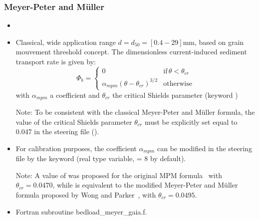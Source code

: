 \subsubsection{Meyer-Peter and M\"uller}
\begin{itemize}
\item {}
\item Classical, wide application range $d=d_{50} = [0.4-29]$mm, based on grain mouvement threshold concept. The dimensionless current-induced sediment transport rate is given by:
\begin{equation*}
\Phi_b=\left\{\begin{array}{ll}
0 & \text{if}\,\theta<\theta_{cr}\\
\alpha_{mpm}(\theta-\theta_{cr})^{3/2} & \text{otherwise}
\end{array}
\right.
\end{equation*}
with $\alpha_{mpm}$ a coefficient and $\theta_{cr}$ the critical Shields parameter (keyword )

   \begin{WarningBlock}{Note:}
  To be consistent with the classical Meyer-Peter and M\"uller formula, the value of the critical Shields parameter $\theta_{cr}$ must be explicitly set equal to 0.047 in the steering file ().
\end{WarningBlock}

\item For calibration purposes, the coefficient $\alpha_{mpm}$ can be modified in the steering file by the keyword  (real type variable, {\ttfamily = 8} by default).

  \begin{WarningBlock}{Note:}
  A value of  was proposed for the original MPM formula~\cite{GarciaBook2006} with $\theta_{cr}=0.0470$, while  is equivalent to the modified Meyer-Peter and M\"uller formula proposed by Wong and Parker~\cite{WongParker06}, with $\theta_{cr}=0.0495$.
  \end{WarningBlock}



\item Fortran subroutine {\ttfamily bedload\_meyer\_gaia.f}.

\end{itemize}

